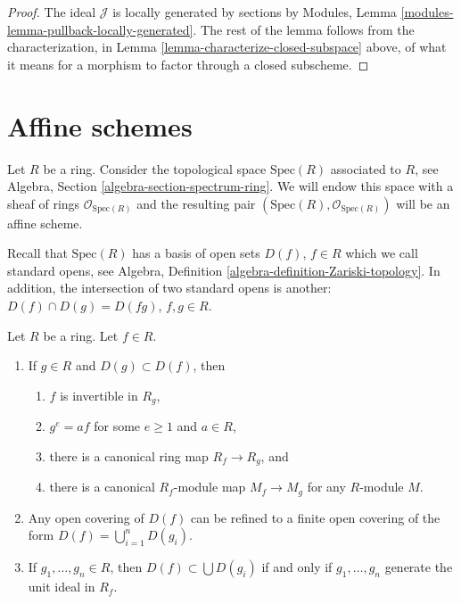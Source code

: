 \begin{proof}
The ideal $\mathcal{J}$ is locally generated by sections 
by Modules, Lemma \ref{modules-lemma-pullback-locally-generated}.
The rest of the lemma follows from the characterization,
in Lemma \ref{lemma-characterize-closed-subspace} above,
of what it means for a morphism to factor through a closed
subscheme.
\end{proof}














\section{Affine schemes}
\label{section-affine-schemes}

\noindent
Let $R$ be a ring. Consider the topological space $\text{Spec}(R)$
associated to $R$, see Algebra, Section \ref{algebra-section-spectrum-ring}.
We will endow this space with a sheaf of rings $\mathcal{O}_{\text{Spec}(R)}$
and the resulting pair $(\text{Spec}(R), \mathcal{O}_{\text{Spec}(R)})$
will be an affine scheme.

\medskip\noindent
Recall that $\text{Spec}(R)$ has a basis of open sets $D(f)$,
$f \in R$ which we call standard opens, see Algebra,
Definition \ref{algebra-definition-Zariski-topology}.
In addition, the intersection of two standard opens is another:
$D(f) \cap D(g) = D(fg)$, $f,g\in R$.

\begin{lemma}
\label{lemma-standard-open}
Let $R$ be a ring. Let $f \in R$.
\begin{enumerate}
\item If $g\in R$ and $D(g) \subset D(f)$, then
\begin{enumerate}
\item $f$ is invertible in $R_g$,
\item $g^e = af$ for some $e \geq 1$ and $a \in R$,
\item there is a canonical ring map $R_f \to R_g$, and
\item there is a canonical $R_f$-module map
$M_f \to M_g$ for any $R$-module $M$.
\end{enumerate}
\item Any open covering of $D(f)$ can be refined to a finite
open covering of the form $D(f) = \bigcup_{i=1}^n D(g_i)$.
\item If $g_1,\ldots,g_n \in R$, then $D(f) \subset \bigcup D(g_i)$
if and only if $g_1,\ldots,g_n$ generate the unit ideal in $R_f$.
\end{enumerate}
\end{lemma}

